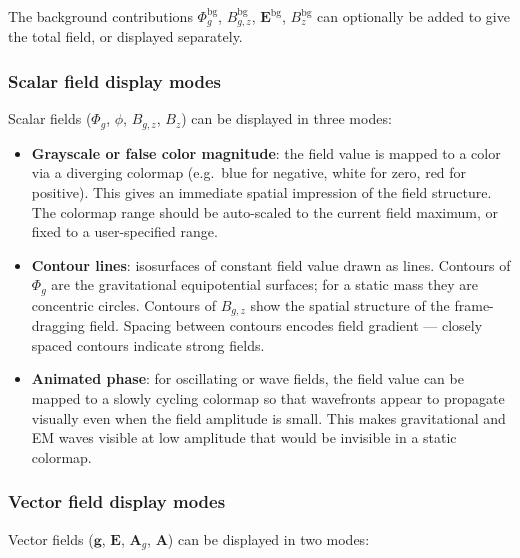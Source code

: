 \documentclass[11pt,a4paper]{article}
\newcommand{\vv}[1]{\mathbf{#1}}
\newcommand{\Phig}{\Phi_g}
\newcommand{\Ag}{\vv{A}_g}
\begin{document}
The background contributions $\Phig^{\mathrm{bg}}$, $B_{g,z}^{\mathrm{bg}}$, $\vv{E}^{\mathrm{bg}}$, $B_z^{\mathrm{bg}}$ can optionally be added to give the total field, or displayed separately.

\subsubsection*{Scalar field display modes}

Scalar fields ($\Phig$, $\phi$, $B_{g,z}$, $B_z$) can be displayed in three modes:

\begin{itemize}
  \item \textbf{Grayscale or false color magnitude}: the field value is mapped to a color via a diverging colormap (e.g.\ blue for negative, white for zero, red for positive).  This gives an immediate spatial impression of the field structure.  The colormap range should be auto-scaled to the current field maximum, or fixed to a user-specified range.

  \item \textbf{Contour lines}: isosurfaces of constant field value drawn as lines.  Contours of $\Phig$ are the gravitational equipotential surfaces; for a static mass they are concentric circles.  Contours of $B_{g,z}$ show the spatial structure of the frame-dragging field.  Spacing between contours encodes field gradient --- closely spaced contours indicate strong fields.

  \item \textbf{Animated phase}: for oscillating or wave fields, the field value can be mapped to a slowly cycling colormap so that wavefronts appear to propagate visually even when the field amplitude is small.  This makes gravitational and EM waves visible at low amplitude that would be invisible in a static colormap.
\end{itemize}

\subsubsection*{Vector field display modes}

Vector fields ($\vv{g}$, $\vv{E}$, $\Ag$, $\vv{A}$) can be displayed in two modes:
\end{document}
